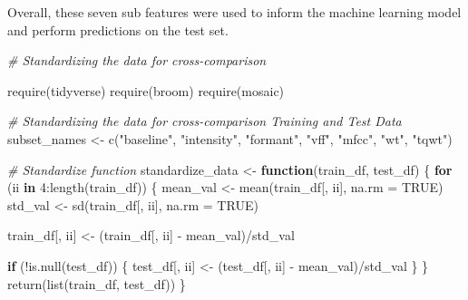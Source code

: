 \documentclass[
]{article}
\newenvironment{Shaded}{\begin{snugshade}}{\end{snugshade}}
\newcommand{\AttributeTok}[1]{\textcolor[rgb]{0.77,0.63,0.00}{#1}}
\newcommand{\CommentTok}[1]{\textcolor[rgb]{0.56,0.35,0.01}{\textit{#1}}}
\newcommand{\ConstantTok}[1]{\textcolor[rgb]{0.00,0.00,0.00}{#1}}
\newcommand{\ControlFlowTok}[1]{\textcolor[rgb]{0.13,0.29,0.53}{\textbf{#1}}}
\newcommand{\DecValTok}[1]{\textcolor[rgb]{0.00,0.00,0.81}{#1}}
\newcommand{\FunctionTok}[1]{\textcolor[rgb]{0.00,0.00,0.00}{#1}}
\newcommand{\NormalTok}[1]{#1}
\newcommand{\OtherTok}[1]{\textcolor[rgb]{0.56,0.35,0.01}{#1}}
\newcommand{\SpecialCharTok}[1]{\textcolor[rgb]{0.00,0.00,0.00}{#1}}
\newcommand{\StringTok}[1]{\textcolor[rgb]{0.31,0.60,0.02}{#1}}
\begin{document}
Overall, these seven sub features were used to inform the machine learning model and perform predictions on the test set.

\begin{Shaded}
\begin{Highlighting}[]
\CommentTok{\# Standardizing the data for cross{-}comparison}

\FunctionTok{require}\NormalTok{(tidyverse)}
\FunctionTok{require}\NormalTok{(broom)}
\FunctionTok{require}\NormalTok{(mosaic)}

\CommentTok{\# Standardizing the data for cross{-}comparison Training and Test Data}
\NormalTok{subset\_names }\OtherTok{\textless{}{-}} \FunctionTok{c}\NormalTok{(}\StringTok{"baseline"}\NormalTok{, }\StringTok{"intensity"}\NormalTok{, }\StringTok{"formant"}\NormalTok{, }\StringTok{"vff"}\NormalTok{, }\StringTok{"mfcc"}\NormalTok{, }\StringTok{"wt"}\NormalTok{, }\StringTok{"tqwt"}\NormalTok{)}

\CommentTok{\# Standardize function}
\NormalTok{standardize\_data }\OtherTok{\textless{}{-}} \ControlFlowTok{function}\NormalTok{(train\_df, test\_df) \{}
    \ControlFlowTok{for}\NormalTok{ (ii }\ControlFlowTok{in} \DecValTok{4}\SpecialCharTok{:}\FunctionTok{length}\NormalTok{(train\_df)) \{}
\NormalTok{        mean\_val }\OtherTok{\textless{}{-}} \FunctionTok{mean}\NormalTok{(train\_df[, ii], }\AttributeTok{na.rm =} \ConstantTok{TRUE}\NormalTok{)}
\NormalTok{        std\_val }\OtherTok{\textless{}{-}} \FunctionTok{sd}\NormalTok{(train\_df[, ii], }\AttributeTok{na.rm =} \ConstantTok{TRUE}\NormalTok{)}

\NormalTok{        train\_df[, ii] }\OtherTok{\textless{}{-}}\NormalTok{ (train\_df[, ii] }\SpecialCharTok{{-}}\NormalTok{ mean\_val)}\SpecialCharTok{/}\NormalTok{std\_val}

        \ControlFlowTok{if}\NormalTok{ (}\SpecialCharTok{!}\FunctionTok{is.null}\NormalTok{(test\_df)) \{}
\NormalTok{            test\_df[, ii] }\OtherTok{\textless{}{-}}\NormalTok{ (test\_df[, ii] }\SpecialCharTok{{-}}\NormalTok{ mean\_val)}\SpecialCharTok{/}\NormalTok{std\_val}
\NormalTok{        \}}
\NormalTok{    \}}
    \FunctionTok{return}\NormalTok{(}\FunctionTok{list}\NormalTok{(train\_df, test\_df))}
\NormalTok{\}}


\end{Highlighting}
\end{Shaded}
\end{document}
